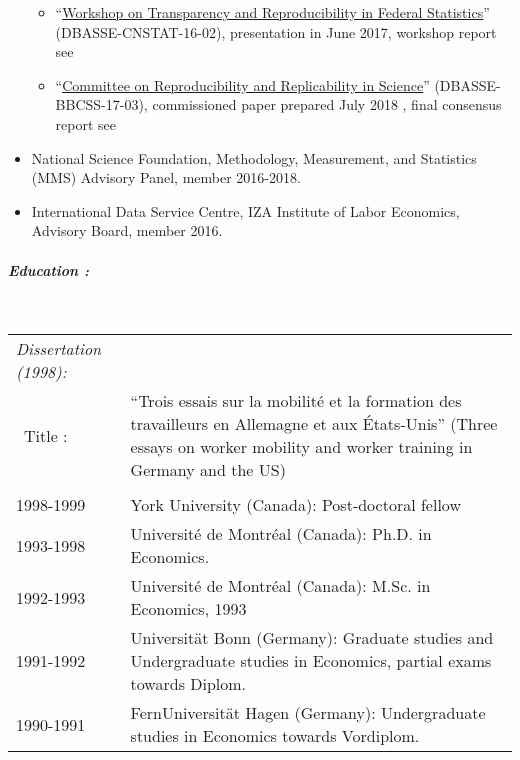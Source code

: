 \documentclass[10pt,letterpaper]{report}
\begin{document}
\begin{itemize}
\begin{itemize}
	\item ``\href{https://www8.nationalacademies.org/pa/projectview.aspx?key=49809}{Workshop on Transparency and Reproducibility in Federal Statistics}'' (DBASSE-CNSTAT-16-02), presentation in June 2017, workshop report see \cite{NAP25305}
	\item ``\href{https://www8.nationalacademies.org/pa/projectview.aspx?key=49906}{Committee on Reproducibility and Replicability in Science}'' (DBASSE-BBCSS-17-03), commissioned paper prepared July 2018 \parencite{vilhuber2018nap}, final consensus report see \cite{NAP25303}
\end{itemize}
\item National Science Foundation, Methodology, Measurement, and Statistics (MMS) Advisory Panel, member 2016-2018.
\item International Data Service Centre, IZA Institute of Labor Economics, Advisory Board, member 2016.
\end{itemize}

  
\paragraph{\it \bf Education :}
\ \\
\begin{tabular}{lp{4in}}
\it Dissertation (1998): \\
\ Title :&``Trois essais sur la mobilit\'e et la formation des travailleurs en Allemagne et aux
\'Etats-Unis'' (Three essays on worker mobility and worker training in
Germany and the US)\\
\\
1998-1999   &    York University (Canada): Post-doctoral fellow \\
1993-1998   &    Universit\'e de Montr\'eal (Canada): Ph.D. in Economics. \\
1992-1993   &    Universit\'e de Montr\'eal (Canada): M.Sc. in Economics, 1993 \\
1991-1992   &    Universit\"at Bonn (Germany): Graduate studies and Undergraduate studies in Economics, partial exams towards Diplom.     \\
1990-1991   &    FernUniversit\"at Hagen (Germany): Undergraduate studies in Economics towards Vordiplom. \\
\end{tabular}
\end{document}
